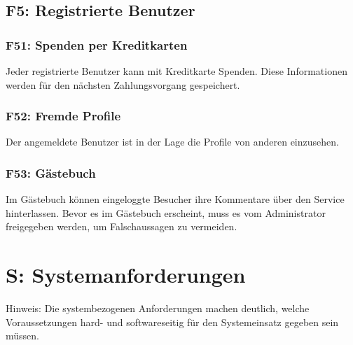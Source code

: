 \documentclass[10pt,a4paper]{scrartcl}
\begin{document}
%

\subsection{F5: Registrierte Benutzer}

\subsubsection*{F51: Spenden per Kreditkarten}
Jeder registrierte Benutzer kann mit Kreditkarte Spenden. Diese Informationen werden für den nächsten Zahlungsvorgang gespeichert.

\subsubsection*{F52: Fremde Profile}

Der angemeldete Benutzer ist in der Lage die Profile von anderen einzusehen.

\subsubsection*{F53: Gästebuch}

Im Gästebuch können eingeloggte Besucher ihre Kommentare über den Service hinterlassen. Bevor es im Gästebuch erscheint, muss es vom Administrator freigegeben werden, um Falschaussagen zu vermeiden.


\section{S: Systemanforderungen}
Hinweis: Die systembezogenen Anforderungen machen deutlich, welche Voraussetzungen hard- und softwareseitig für den Systemeinsatz gegeben sein müssen.
\end{document}
